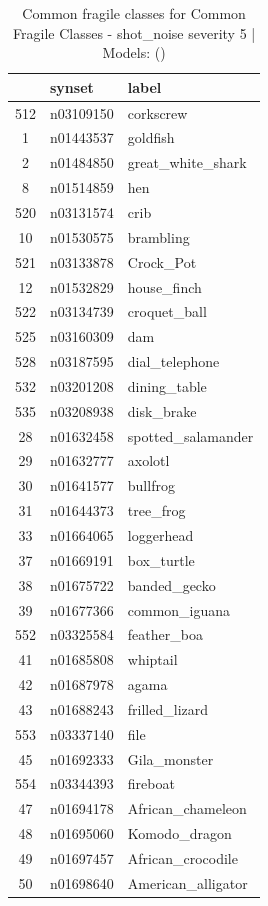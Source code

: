 \begin{table}
\caption{Common fragile classes for Common Fragile Classes - shot_noise severity 5 | Models: ()}
\label{tab:Common Fragile Classes - shot_noise severity 5_d41d8cd9}
\begin{tabular}{cll}
\toprule
 & synset & label \\
\midrule
512 & n03109150 & corkscrew \\
1 & n01443537 & goldfish \\
2 & n01484850 & great_white_shark \\
8 & n01514859 & hen \\
520 & n03131574 & crib \\
10 & n01530575 & brambling \\
521 & n03133878 & Crock_Pot \\
12 & n01532829 & house_finch \\
522 & n03134739 & croquet_ball \\
525 & n03160309 & dam \\
528 & n03187595 & dial_telephone \\
532 & n03201208 & dining_table \\
535 & n03208938 & disk_brake \\
28 & n01632458 & spotted_salamander \\
29 & n01632777 & axolotl \\
30 & n01641577 & bullfrog \\
31 & n01644373 & tree_frog \\
33 & n01664065 & loggerhead \\
37 & n01669191 & box_turtle \\
38 & n01675722 & banded_gecko \\
39 & n01677366 & common_iguana \\
552 & n03325584 & feather_boa \\
41 & n01685808 & whiptail \\
42 & n01687978 & agama \\
43 & n01688243 & frilled_lizard \\
553 & n03337140 & file \\
45 & n01692333 & Gila_monster \\
554 & n03344393 & fireboat \\
47 & n01694178 & African_chameleon \\
48 & n01695060 & Komodo_dragon \\
49 & n01697457 & African_crocodile \\
50 & n01698640 & American_alligator \\

\end{tabular}
\end{table}
